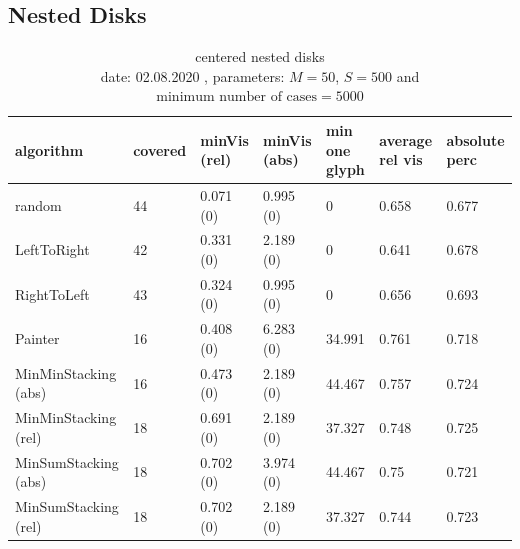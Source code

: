 \documentclass[a4paper,11pt]{article}
\begin{document}
\subsection*{Nested Disks}
\begin{table}[h]
  \begin{center}
    \begin{tabular}{| l || p{1.3cm} | p{1.7cm} | p{1.7cm} | p{1.5cm} | p{1.5cm} | p{1.5cm} |}
      \hline
      algorithm & covered & minVis (rel) & minVis (abs) & min one glyph & average rel vis &absolute perc\\
      \hline
      random & 44 & 0.071 (0) & 0.995 (0) & 0 & 0.658 & 0.677\\

      LeftToRight & 42 & 0.331 (0) & 2.189 (0) & 0 & 0.641 & 0.678\\

      RightToLeft & 43 & 0.324 (0) & 0.995 (0) & 0 & 0.656 & 0.693\\

      Painter & 16 & 0.408 (0) & 6.283 (0) & 34.991 & 0.761 & 0.718\\

      MinMinStacking (abs) & 16 & 0.473 (0) & 2.189 (0) & 44.467 & 0.757 & 0.724\\

      MinMinStacking (rel) & 18 & 0.691 (0) & 2.189 (0) & 37.327 & 0.748 & 0.725\\

      MinSumStacking (abs) & 18 & 0.702 (0) & 3.974 (0) & 44.467 & 0.75 & 0.721\\

      MinSumStacking (rel) & 18 & 0.702 (0) & 2.189 (0) & 37.327 & 0.744 & 0.723\\

      \hline
    \end{tabular}
  \end{center}
  \caption{centered nested disks\\
  date: 02.08.2020  , parameters: $M=50$, $S=500$ and $\text{minimum number of cases}=5000$  }
\end{table}
\end{document}
